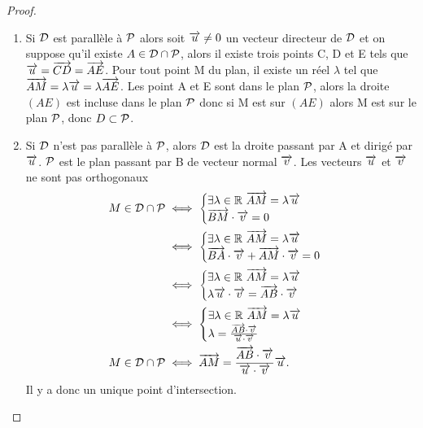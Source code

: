 \begin{proof}
  \begin{enumerate}
    \item Si \(\Dr\) est parallèle à \(\P\) alors soit \(\vu\neq 0\) un vecteur 
      directeur de \(\Dr\) et on suppose qu'il existe \(A\in\Dr\cap\P\), alors 
      il existe trois points C, D et E tels que \(\vu = \vect{CD} = \vect{AE}\). 
      Pour tout point M du plan, il existe un réel \(\lambda\) tel que 
      \(\vect{AM} = \lambda\vu = \lambda\vect{AE}\). Les point A et E sont dans le 
      plan \(\P\), alors la droite \((AE)\) est incluse dans le plan \(\P\) donc 
      si M est sur \((AE)\) alors M est sur le plan \(\P\), donc \(D \subset 
      \P\).
    \item Si \(\Dr\) n'est pas parallèle à \(\P\), alors \(\Dr\) est la droite 
      passant par A et dirigé par \(\vu\). \(\P\) est le plan passant par B de 
      vecteur normal \(\vv\). Les vecteurs \(\vu\) et \(\vv\) ne sont pas 
      orthogonaux
      \begin{align}
        M \in \Dr\cap\P 
        & \iff 
        \begin{cases}
          \exists \lambda \in \R \ \vect{AM} = \lambda\vu \\ 
          \vect{BM}\cdot\vv = 0
        \end{cases} \\
        & \iff 
        \begin{cases}
          \exists \lambda \in \R \ \vect{AM}=\lambda\vu \\ 
          \vect{BA}\cdot\vv + \vect{AM}\cdot\vv = 0
        \end{cases}\\
        & \iff
        \begin{cases}
          \exists \lambda \in \R \ \vect{AM}=\lambda\vu \\
          \lambda\vu\cdot\vv = \vect{AB}\cdot\vv
        \end{cases}\\
        & \iff
        \begin{cases}
          \exists \lambda \in \R \ \vect{AM}=\lambda\vu \\
          \lambda = \frac{\vect{AB}\cdot\vv}{\vu\cdot\vv}
        \end{cases}\\
        M \in \Dr\cap\P &\iff 
        \vect{AM} = \frac{\vect{AB}\cdot\vv}{\vu\cdot\vv}\vu.
      \end{align}
      Il y a donc un unique point d'intersection.
  \end{enumerate}
\end{proof}

